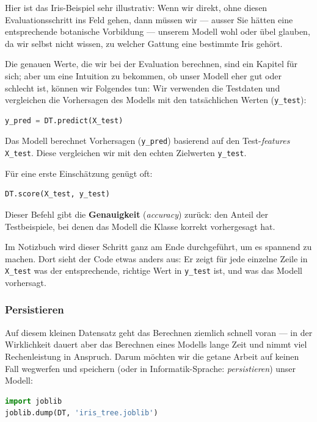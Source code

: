 \begin{lpu}
Hier ist das Iris-Beispiel sehr illustrativ: Wenn wir direkt, ohne diesen Evaluationsschritt ins Feld gehen, dann müssen wir — ausser Sie hätten eine entsprechende botanische Vorbildung — unserem Modell wohl oder übel glauben, da wir selbst nicht wissen, zu welcher Gattung eine bestimmte Iris gehört.

Die genauen Werte, die wir bei der Evaluation berechnen, sind ein Kapitel für sich; aber um eine Intuition zu bekommen, ob unser Modell eher gut oder schlecht ist, können wir Folgendes tun: Wir verwenden die Testdaten und vergleichen die Vorhersagen des Modells mit den tatsächlichen Werten (\texttt{y\_test}):

\begin{lstlisting}[language=Python]
y_pred = DT.predict(X_test)
\end{lstlisting}

Das Modell berechnet Vorhersagen (\texttt{y\_pred}) basierend auf den Test-\textit{features} \texttt{X\_test}. Diese vergleichen wir mit den echten Zielwerten \texttt{y\_test}.

Für eine erste Einschätzung genügt oft:

\begin{lstlisting}[language=Python]
DT.score(X_test, y_test)
\end{lstlisting}

Dieser Befehl gibt die \textbf{Genauigkeit} (\textit{accuracy}) zurück: den Anteil der Testbeispiele, bei denen das Modell die Klasse korrekt vorhergesagt hat.

Im Notizbuch wird dieser Schritt ganz am Ende durchgeführt, um es spannend zu machen. Dort sieht der Code etwas anders aus: Er zeigt für jede einzelne Zeile in \texttt{X\_test} was der entsprechende, richtige Wert in \texttt{y\_test} ist, und was das Modell vorhersagt.


\subsubsection*{Persistieren}
Auf diesem kleinen Datensatz geht das Berechnen ziemlich schnell voran — in der Wirklichkeit dauert aber das Berechnen eines Modells lange Zeit und nimmt viel Rechenleistung in Anspruch. Darum möchten wir die getane Arbeit auf keinen Fall wegwerfen und speichern (oder in Informatik-Sprache: \textit{persistieren}) unser Modell:

\begin{lstlisting}[language=Python]
import joblib
joblib.dump(DT, 'iris_tree.joblib')
\end{lstlisting}


\end{lpu}
